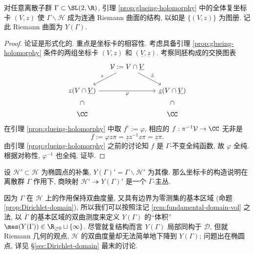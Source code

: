 \begin{definition-theorem}\label{prop:Y-chart} 
	对任意离散子群 $\Gamma \subset \SL(2,\R)$, 引理 \ref{prop:glueing-holomorphy} 中的全体复坐标卡 $(V,z)$ 使 $\Gamma \backslash \mathcal{H}$ 成为连通 Riemann 曲面的结构, 以如是 $\{(V,z)\}$ 为图册. 记此 Riemann 曲面为 $Y(\Gamma)$.
\end{definition-theorem}
\begin{proof}
	论证是形式化的. 重点是坐标卡的相容性. 考虑具备引理 \ref{prop:glueing-holomorphy} 条件的两组坐标卡 $(V, z)$ 和 $(\underline{V}, \underline{z})$. 考察同胚构成的交换图表
	\[\begin{tikzcd}[column sep=small]
		& \mathcal{V} := V \cap \underline{V}  \arrow[ld, "z"'] \arrow[rd, "\underline{z}"] & \\
		z(V \cap \underline{V}) \arrow[rr, "\varphi"'] \arrow[phantom, d, "\subset" description, sloped] & & \underline{z}(V \cap \underline{V}) \arrow[phantom, d, "\subset" description, sloped] \\
		\CC & & \CC
	\end{tikzcd}\]
	在引理 \ref{prop:glueing-holomorphy} 中取 $f^\flat := \varphi$, 相应的 $f: \pi^{-1}\mathcal{V} \to \CC$ 无非是
	\[ f := \varphi z \pi = \underline{z} z^{-1} z \pi = \underline{z} \pi. \]
	由引理 \ref{prop:glueing-holomorphy} 之前的讨论知 $f$ 是 $\Gamma$-不变全纯函数, 故 $\varphi$ 全纯. 根据对称性, $\varphi^{-1}$ 也全纯. 证毕.
\end{proof}

\begin{remark}
	设 $\mathcal{H}' \subset \mathcal{H}$ 为椭圆点的补集, $Y(\Gamma)' = \Gamma \backslash \mathcal{H}'$ 为其像. 那么坐标卡的构造说明在离散群 $\Gamma$ 作用下, 商映射 $\mathcal{H}' \twoheadrightarrow Y(\Gamma)'$ 是一个 $\overline{\Gamma}$-主丛.
\end{remark}

\begin{remark}\label{rem:Y-metric}
	因为 $\Gamma$ 在 $\mathcal{H}$ 上的作用保持双曲度量, 又具有边界为零测集的基本区域 (命题 \ref{prop:Dirichlet-domain}), 所以我们可以按照注记 \ref{rem:fundamental-domain-vol} 之法, 以 $\overline{\Gamma}$ 的基本区域的双曲测度来定义 $Y(\Gamma)$ 的``体积'' $\mes(Y(\Gamma)) \in \R_{\geq 0} \sqcup \{\infty\}$. 尽管就复结构而言 $Y(\Gamma)$ 局部同构于 $\mathcal{D}$, 但就 Riemann 几何的观点, $\mathcal{H}$ 的双曲度量却无法简单地下降到 $Y(\Gamma)$; 问题出在椭圆点, 详见 \S\ref{sec:Dirichlet-domain} 最末的讨论.
\end{remark}

